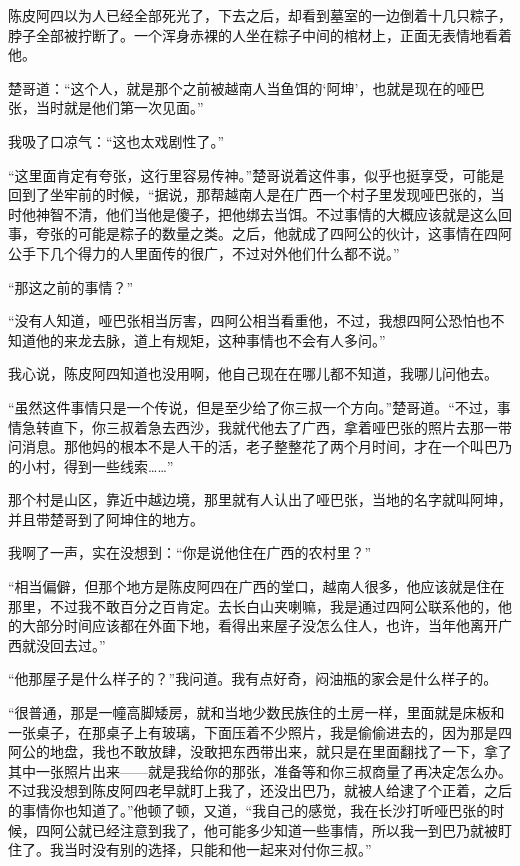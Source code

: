 陈皮阿四以为人已经全部死光了，下去之后，却看到墓室的一边倒着十几只粽子，脖子全部被拧断了。一个浑身赤裸的人坐在粽子中间的棺材上，正面无表情地看着他。

楚哥道：“这个人，就是那个之前被越南人当鱼饵的‘阿坤’，也就是现在的哑巴张，当时就是他们第一次见面。”

我吸了口凉气：“这也太戏剧性了。”

“这里面肯定有夸张，这行里容易传神。”楚哥说着这件事，似乎也挺享受，可能是回到了坐牢前的时候，“据说，那帮越南人是在广西一个村子里发现哑巴张的，当时他神智不清，他们当他是傻子，把他绑去当饵。不过事情的大概应该就是这么回事，夸张的可能是粽子的数量之类。之后，他就成了四阿公的伙计，这事情在四阿公手下几个得力的人里面传的很广，不过对外他们什么都不说。”

“那这之前的事情？”

“没有人知道，哑巴张相当厉害，四阿公相当看重他，不过，我想四阿公恐怕也不知道他的来龙去脉，道上有规矩，这种事情也不会有人多问。”

我心说，陈皮阿四知道也没用啊，他自己现在在哪儿都不知道，我哪儿问他去。

“虽然这件事情只是一个传说，但是至少给了你三叔一个方向。”楚哥道。“不过，事情急转直下，你三叔着急去西沙，我就代他去了广西，拿着哑巴张的照片去那一带问消息。那他妈的根本不是人干的活，老子整整花了两个月时间，才在一个叫巴乃的小村，得到一些线索……”

那个村是山区，靠近中越边境，那里就有人认出了哑巴张，当地的名字就叫阿坤，并且带楚哥到了阿坤住的地方。

我啊了一声，实在没想到：“你是说他住在广西的农村里？”

“相当偏僻，但那个地方是陈皮阿四在广西的堂口，越南人很多，他应该就是住在那里，不过我不敢百分之百肯定。去长白山夹喇嘛，我是通过四阿公联系他的，他的大部分时间应该都在外面下地，看得出来屋子没怎么住人，也许，当年他离开广西就没回去过。”

“他那屋子是什么样子的？”我问道。我有点好奇，闷油瓶的家会是什么样子的。

“很普通，那是一幢高脚矮房，就和当地少数民族住的土房一样，里面就是床板和一张桌子，在那桌子上有玻璃，下面压着不少照片，我是偷偷进去的，因为那是四阿公的地盘，我也不敢放肆，没敢把东西带出来，就只是在里面翻找了一下，拿了其中一张照片出来——就是我给你的那张，准备等和你三叔商量了再决定怎么办。不过我没想到陈皮阿四老早就盯上我了，还没出巴乃，就被人给逮了个正着，之后的事情你也知道了。”他顿了顿，又道，“我自己的感觉，我在长沙打听哑巴张的时候，四阿公就已经注意到我了，他可能多少知道一些事情，所以我一到巴乃就被盯住了。我当时没有别的选择，只能和他一起来对付你三叔。”

